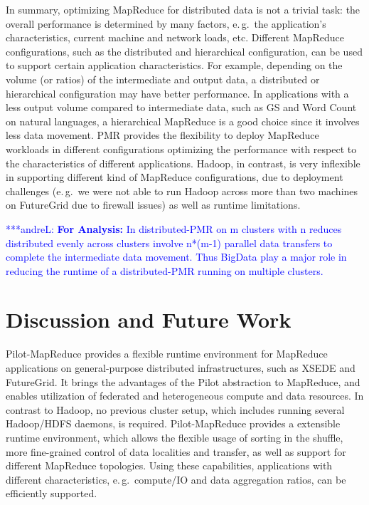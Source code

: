 \documentclass{acm_proc_article-sp}
\newcommand{\alnote}[1]{ {\textcolor{blue} { ***andreL: #1 }}}
\newcommand{\alnote}[1]{}
\newcommand{\upp}{\vspace*{-0.5em}}
\newcommand{\pilotmapreduce}{Pilot-MapReduce\xspace}
\begin{document}
In summary, optimizing MapReduce for distributed data is not a trivial
task: the overall performance is determined by many factors, e.\,g.\
the application's characteristics, current machine and network loads,
etc. Different MapReduce configurations, such as the distributed and
hierarchical configuration, can be used to support certain application
characteristics. For example, depending on the volume (or ratios) of
the intermediate and output data, a distributed or hierarchical
configuration may have better performance. In applications with a less
output volume compared to intermediate data, such as GS and Word Count
on natural languages, a hierarchical MapReduce is a good choice since
it involves less data movement. PMR provides the flexibility to deploy
MapReduce workloads in different configurations optimizing the
performance with respect to the characteristics of different
applications. Hadoop, in contrast, is very inflexible in supporting
different kind of MapReduce configurations, due to deployment
challenges (e.\,g.\ we were not able to run Hadoop across more than
two machines on FutureGrid due to firewall issues) as well as runtime
limitations.

\alnote{\textbf{For Analysis:}
In distributed-PMR on m clusters
with n reduces distributed evenly across clusters involve n*(m-1) parallel data
transfers to complete the intermediate data movement. Thus BigData play a major
role in reducing the runtime of a distributed-PMR running on multiple clusters.
}
\upp\upp
\section{Discussion and Future Work}
\label{sec-conclusion}

\pilotmapreduce provides a flexible runtime environment for MapReduce
applications on general-purpose distributed infrastructures, such as XSEDE and
FutureGrid. It brings the advantages of the Pilot abstraction to MapReduce, and
enables utilization of federated and heterogeneous compute and data resources.
In contrast to Hadoop, no previous cluster setup, which includes running several
Hadoop/HDFS daemons, is required. Pilot-MapReduce provides a extensible runtime
environment, which allows the flexible usage of sorting in the shuffle, more
fine-grained control of data localities and transfer, as well as support for
different MapReduce topologies. Using these capabilities, applications with
different characteristics, e.\,g.\ compute/IO and data aggregation ratios, can
be efficiently supported. 
\end{document}
